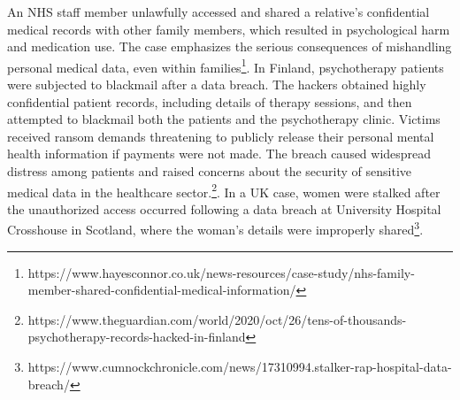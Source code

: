 \documentclass{article}
\begin{document}
An NHS staff member unlawfully accessed and shared a relative's confidential medical records with other family members, which resulted in psychological harm and medication use. 
The case emphasizes the serious consequences of mishandling personal medical data, even within families\footnote{https://www.hayesconnor.co.uk/news-resources/case-study/nhs-family-member-shared-confidential-medical-information/}. 
In Finland, psychotherapy patients were subjected to blackmail after a data breach. The hackers obtained highly confidential patient records, including details of therapy sessions, and then attempted to blackmail both the patients and the psychotherapy clinic. Victims received ransom demands threatening to publicly release their personal mental health information if payments were not made. The breach caused widespread distress among patients and raised concerns about the security of sensitive medical data in the healthcare sector.\footnote{https://www.theguardian.com/world/2020/oct/26/tens-of-thousands-psychotherapy-records-hacked-in-finland}. 
In a UK case, women were stalked after the unauthorized access occurred following a data breach at University Hospital Crosshouse in Scotland, where the woman's details were improperly shared\footnote{https://www.cumnockchronicle.com/news/17310994.stalker-rap-hospital-data-breach/}. 
\newline
\end{document}

